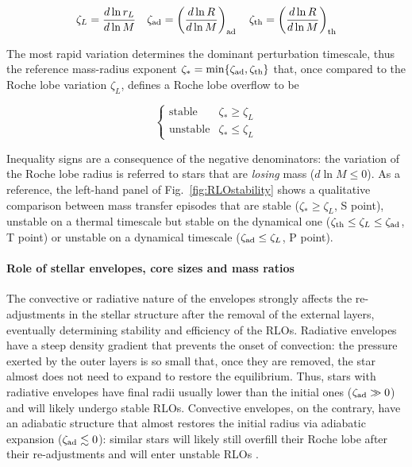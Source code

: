 \documentclass[a4paper,titlepage]{book}     	%
\begin{document}
\begin{equation}\label{eq:zetaRLO}
\zeta_L = \frac{d \ln r_L}{d \ln M} \quad \zeta_\textup{ad} = \left(\frac{d \ln R}{d \ln M}\right)_\textup{ad} \quad \zeta_\textup{th} = \left(\frac{d \ln R}{d \ln M}\right)_\textup{th}
\end{equation}

The most rapid variation determines the dominant perturbation timescale, thus the reference mass-radius exponent $\zeta_* = \min\{\zeta_\textup{ad},\zeta_\textup{th}\}$ that, once compared to the Roche lobe variation $\zeta_L$, defines a Roche lobe overflow to be

\begin{equation}
\begin{cases}
\text{stable} &  \zeta_* \geq \zeta_L \\
\text{unstable} &  \zeta_* \leq \zeta_L
\end{cases}
\end{equation}

Inequality signs are a consequence of the negative denominators: the variation of the Roche lobe radius is referred to stars that are \emph{losing} mass ($d \ln M \leq 0$). As a reference, the left-hand panel of Fig.\ \ref{fig:RLOstability} shows a qualitative comparison between mass transfer episodes that are stable ($\zeta_* \geq \zeta_L$, S point), unstable on a thermal timescale but stable on the dynamical one ($\zeta_\textup{th} \leq \zeta_L \leq \zeta_\textup{ad}$, T point) or unstable on a dynamical timescale ($\zeta_\textup{ad} \leq \zeta_L$, P point).

\paragraph{Role of stellar envelopes, core sizes and mass ratios} The convective or radiative nature of the envelopes strongly affects the re-adjustments in the stellar structure after the removal of the external layers, eventually determining stability and efficiency of the RLOs. Radiative envelopes have a steep density gradient that prevents the onset of convection: the pressure exerted by the outer layers is so small that, once they are removed, the star almost does not need to expand to restore the equilibrium. Thus, stars with radiative envelopes have final radii usually lower than the initial ones ($\zeta_{\rm {ad}} \gg 0$) and will likely undergo stable RLOs. Convective envelopes, on the contrary, have an adiabatic structure that almost restores the initial radius via adiabatic expansion ($\zeta_{\rm {ad}} \lesssim 0$): similar stars will likely still overfill their Roche lobe after their re-adjustments and will enter unstable RLOs \cite{binaries} .\\
\end{document}
